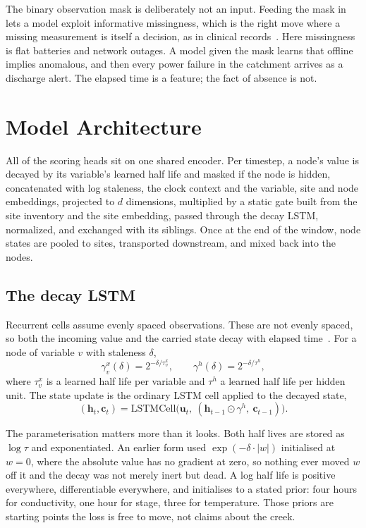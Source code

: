 \documentclass{article}
\begin{document}
The binary observation mask is deliberately not an input. Feeding the mask in
lets a model exploit informative missingness, which is the right move where a
missing measurement is itself a decision, as in clinical
records~\citep{che2018grud}. Here missingness is flat batteries and network
outages. A model given the mask learns that offline implies anomalous, and
then every power failure in the catchment arrives as a discharge alert. The
elapsed time is a feature; the fact of absence is not.

\section{Model Architecture}
\label{sec:architecture}

All of the scoring heads sit on one shared encoder. Per timestep, a node's
value is decayed by its variable's learned half life and masked if the node is
hidden, concatenated with log staleness, the clock context and the variable,
site and node embeddings, projected to $d$ dimensions, multiplied by a static
gate built from the site inventory and the site embedding, passed through the
decay LSTM, normalized, and exchanged with its siblings. Once at the end of the
window, node states are pooled to sites, transported downstream, and mixed back
into the nodes.

\subsection{The decay LSTM}
\label{sec:decay}

Recurrent cells assume evenly spaced observations. These are not evenly spaced,
so both the incoming value and the carried state decay with elapsed
time~\citep{hochreiter1997lstm}. For a node of variable $v$ with staleness
$\delta$,
\begin{equation}
  \gamma^{x}_{v}(\delta) = 2^{-\delta / \tau^{x}_{v}},
  \qquad
  \gamma^{h}(\delta) = 2^{-\delta / \tau^{h}},
\end{equation}
where $\tau^{x}_{v}$ is a learned half life per variable and $\tau^{h}$ a
learned half life per hidden unit. The state update is the ordinary LSTM cell
applied to the decayed state,
\begin{equation}
  (\bm{h}_{t}, \bm{c}_{t}) = \mathrm{LSTMCell}\big(\bm{u}_{t},\ (\bm{h}_{t-1} \odot \gamma^{h},\ \bm{c}_{t-1})\big).
\end{equation}

The parameterisation matters more than it looks. Both half lives are stored as
$\log \tau$ and exponentiated. An earlier form used $\exp(-\delta \cdot |w|)$
initialised at $w = 0$, where the absolute value has no gradient at zero, so
nothing ever moved $w$ off it and the decay was not merely inert but dead. A
log half life is positive everywhere, differentiable everywhere, and
initialises to a stated prior: four hours for conductivity, one hour for stage,
three for temperature. Those priors are starting points the loss is free to
move, not claims about the creek.
\end{document}
